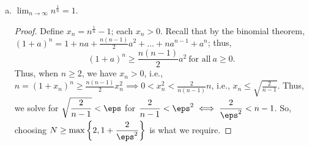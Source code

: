 \begin{example}
\begin{enumerate}[(a)]
		\item \(\displaystyle\lim_{n\to\infty}n^{\frac{1}{n}}=1\).
		\begin{proof}
			Define \(x_n=\displaystyle n^{\frac{1}{n}}-1\); each \(x_n>0\). Recall that by the binomial theorem, \((1+a)^n=1+na+\displaystyle\frac{n(n-1)}{2}a^2+\dots+na^{n-1}+a^n\); thus, 
			\begin{equation*}
				(1+a)^n\geq \frac{n(n-1)}{2}a^2~\text{for all}~a\geq 0.
			\end{equation*}
			Thus, when \(n\geq 2\), we have \(x_n>0\), i.e., \(n=(1+x_n)^n\geq\displaystyle\frac{n(n-1)}{2}x_n^2\implies 0<x_n^2<\displaystyle\frac{2}{n(n-1)}n\), i.e., \(x_n\leq\displaystyle\sqrt{\frac{2}{n-1}}\). Thus, we solve for \(\displaystyle\sqrt{\frac{2}{n-1}}<\eps\) for \(\displaystyle\frac{2}{n-1}<\eps^2\iff \frac{2}{\eps^2}<n-1\). So, choosing \(N\geq \operatorname{max}\left\{2,1+\displaystyle\frac{2}{\eps^2}\right\}\) is what we require.
		\end{proof}
	\end{enumerate}
\end{example}